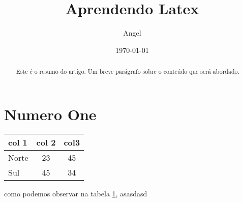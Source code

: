 \documentclass[12pt]{article}
\title{Aprendendo Latex}
\author{Angel}
\date{\today}
\begin{document}
\maketitle

\begin{abstract}
Este é o resumo do artigo. Um breve parágrafo sobre o conteúdo que será abordado.
\end{abstract}

\section*{Numero One}

\begin{table}[b]
    \label{tab:tabela_dir}
    \centering
    \begin{tabular}{| l | c | c |}
        \hline
        col 1 & col 2 & col3\\
        \hline
        Norte & 23 & 45\\
        Sul & 45 & 34\\
        \hline
    \end{tabular}
\end{table}

como podemos observar na tabela \ref{tab:tabela_dir}, asasdasd
\end{document}
